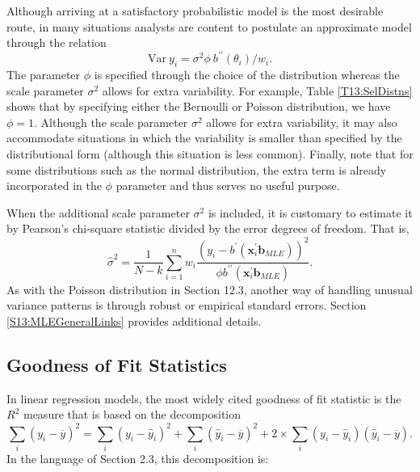 Although arriving at a satisfactory probabilistic model is the most
desirable route, in many situations analysts are content to
postulate an approximate model through the relation
\[
\mathrm{Var~}y_i=\sigma ^{2}\phi ~b^{\prime \prime }(\theta_i)/w_i .
\]
The parameter $\phi $ is specified through the choice of the
distribution whereas the scale parameter $\sigma ^{2}$ allows for
extra variability. For example, Table \ref{T13:SelDistns} shows that
by specifying either the Bernoulli or Poisson distribution, we have
$\phi =1$. Although the scale parameter $\sigma ^{2}$ allows for
extra variability, it may also accommodate situations in which the
variability is smaller than specified by the distributional form
(although this situation is less common). Finally, note that for
some distributions such as the normal distribution, the extra term
is already incorporated in the $\phi $ parameter and thus serves no
useful purpose.

When the additional scale parameter $\sigma ^{2}$ is included, it is
customary to estimate it by Pearson's chi-square statistic divided by the
error degrees of freedom. That is,%
\[
\widehat{\sigma }^{2}=\frac{1}{N-k} \sum_{i=1}^n w_i\frac{\left(
y_i-b^{\prime }(\mathbf{x}_i^{\mathbf{\prime
}}\mathbf{b}_{MLE})\right)
^{2}}{\phi b^{\prime \prime }(\mathbf{x}_i^{\mathbf{\prime }}\mathbf{b}%
_{MLE})} .
\]
As with the Poisson distribution in Section 12.3, another way of
handling unusual variance patterns is through robust or empirical
standard errors. Section \ref{S13:MLEGeneralLinks} provides
additional details.


\subsection{Goodness of Fit Statistics}\label{S13:Goodness}

In linear regression models, the most widely cited goodness of fit
statistic is the $R^2$ measure that is based on the decomposition
\begin{equation*}
\sum_i \left(y_i - \overline{y} \right)^2 = \sum_i \left(y_i -
\widehat{y}_i \right)^2 + \sum_i \left(\widehat{y}_i -
\overline{y}\right)^2 + 2 \times \sum_i \left(y_i - \widehat{y}_i
\right)\left(\widehat{y}_i - \overline{y}\right).
\end{equation*}
In the language of Section 2.3, this decomposition is:

